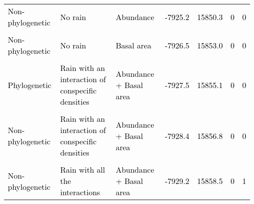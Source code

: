\documentclass[
  12pt,
  letterpaper,
  DIV=11,
  numbers=noendperiod]{scrartcl}
\begin{document}
\begin{table}[H]
{\begin{tabular}[t]{lllllll}
\addlinespace
\textcolor{black}{Non-phylogenetic} & \textcolor{black}{No rain} & \textcolor{black}{Abundance} & \textcolor{black}{-7925.2} & \textcolor{black}{15850.3} & \textcolor{black}{0} & \textcolor{black}{0}\\
\cellcolor{gray!6}{\textcolor{black}{Non-phylogenetic}} & \cellcolor{gray!6}{\textcolor{black}{Rain without interactions}} & \cellcolor{gray!6}{\textcolor{black}{Abundance + Basal area}} & \cellcolor{gray!6}{\textcolor{black}{-7925.9}} & \cellcolor{gray!6}{\textcolor{black}{15851.8}} & \cellcolor{gray!6}{\textcolor{black}{0}} & \cellcolor{gray!6}{\textcolor{black}{3}}\\
\textcolor{black}{Non-phylogenetic} & \textcolor{black}{No rain} & \textcolor{black}{Basal area} & \textcolor{black}{-7926.5} & \textcolor{black}{15853.0} & \textcolor{black}{0} & \textcolor{black}{0}\\
\cellcolor{gray!6}{\textcolor{black}{Phylogenetic}} & \cellcolor{gray!6}{\textcolor{black}{Rain with all the interactions}} & \cellcolor{gray!6}{\textcolor{black}{Abundance + Basal area}} & \cellcolor{gray!6}{\textcolor{black}{-7927.2}} & \cellcolor{gray!6}{\textcolor{black}{15854.4}} & \cellcolor{gray!6}{\textcolor{black}{0}} & \cellcolor{gray!6}{\textcolor{black}{0}}\\
\textcolor{black}{Phylogenetic} & \textcolor{black}{Rain with an interaction of conspecific densities} & \textcolor{black}{Abundance + Basal area} & \textcolor{black}{-7927.5} & \textcolor{black}{15855.1} & \textcolor{black}{0} & \textcolor{black}{0}\\
\addlinespace
\cellcolor{gray!6}{\textcolor{black}{Phylogenetic}} & \cellcolor{gray!6}{\textcolor{black}{No rain}} & \cellcolor{gray!6}{\textcolor{black}{Abundance + Basal area}} & \cellcolor{gray!6}{\textcolor{black}{-7928.0}} & \cellcolor{gray!6}{\textcolor{black}{15856.1}} & \cellcolor{gray!6}{\textcolor{black}{0}} & \cellcolor{gray!6}{\textcolor{black}{0}}\\
\textcolor{black}{Non-phylogenetic} & \textcolor{black}{Rain with an interaction of conspecific densities} & \textcolor{black}{Abundance + Basal area} & \textcolor{black}{-7928.4} & \textcolor{black}{15856.8} & \textcolor{black}{0} & \textcolor{black}{0}\\
\cellcolor{gray!6}{\textcolor{black}{Non-phylogenetic}} & \cellcolor{gray!6}{\textcolor{black}{No rain}} & \cellcolor{gray!6}{\textcolor{black}{Abundance + Basal area}} & \cellcolor{gray!6}{\textcolor{black}{-7928.6}} & \cellcolor{gray!6}{\textcolor{black}{15857.2}} & \cellcolor{gray!6}{\textcolor{black}{0}} & \cellcolor{gray!6}{\textcolor{black}{0}}\\
\textcolor{black}{Non-phylogenetic} & \textcolor{black}{Rain with all the interactions} & \textcolor{black}{Abundance + Basal area} & \textcolor{black}{-7929.2} & \textcolor{black}{15858.5} & \textcolor{black}{0} & \textcolor{black}{1}\\
\bottomrule
\end{tabular}}
\end{table}
\end{document}
